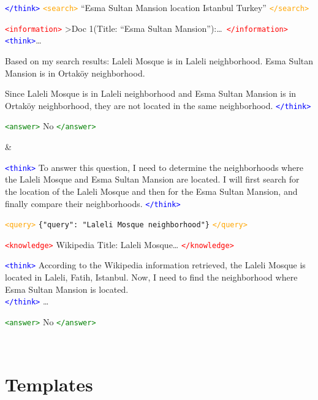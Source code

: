 \begin{table}[htbp]
{\begin{tabular}
{\textcolor{blue}{\texttt{</think>}}
\textcolor{orange}{\texttt{<search>}} ``Esma Sultan Mansion location Istanbul Turkey'' \textcolor{orange}{\texttt{</search>}}

\textcolor{red}{\texttt{<information>}} >Doc 1(Title: ``Esma Sultan Mansion''):\ldots\ \textcolor{red}{\texttt{</information>}}
\textcolor{blue}{\texttt{<think>}}\ldots

Based on my search results: Laleli Mosque is in Laleli neighborhood. Esma Sultan Mansion is in Ortak\"oy neighborhood.

Since Laleli Mosque is in Laleli neighborhood and Esma Sultan Mansion is in Ortak\"oy neighborhood,
they are not located in the same neighborhood.
\textcolor{blue}{\texttt{</think>}}

\textcolor{green}{\texttt{<answer>}} No \textcolor{green}{\texttt{</answer>}}
} &
\parbox[t][6cm][c]{4cm}{\centering
\textcolor{blue}{\texttt{<think>}}
To answer this question, I need to determine the neighborhoods where the Laleli Mosque and Esma Sultan Mansion are located.
I will first search for the location of the Laleli Mosque and then for the Esma Sultan Mansion, and finally compare their neighborhoods.
\textcolor{blue}{\texttt{</think>}}

\textcolor{orange}{\texttt{<query>}}
\texttt{\{"query": "Laleli Mosque neighborhood"\}}
\textcolor{orange}{\texttt{</query>}}

\textcolor{red}{\texttt{<knowledge>}}
Wikipedia Title: Laleli Mosque\ldots
\textcolor{red}{\texttt{</knowledge>}}

\textcolor{blue}{\texttt{<think>}}
According to the Wikipedia information retrieved, the Laleli Mosque is located in Laleli, Fatih, Istanbul.
Now, I need to find the neighborhood where Esma Sultan Mansion is located.\\
\textcolor{blue}{\texttt{</think>}}
\ldots

\textcolor{green}{\texttt{<answer>}} No \textcolor{green}{\texttt{</answer>}}
} \\
\hline

\end{tabular}
} %
\end{table}







\section{Templates}
